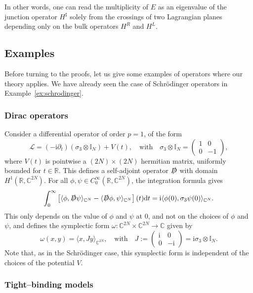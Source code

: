 \documentclass[11pt]{amsart}
\numberwithin{equation}{section} %
\newcommand\1{{\mathds 1}}
\def\C{{\mathbb C}}
\def\bbI{{\mathbb I}}
\def\R{{\mathbb R}}
\def\rd{{\mathrm{d}}}
\def\ri{{\mathrm{i}}}
\def\cL{{\mathcal L}}
\def\bra{\langle}
\def\ket{\rangle}
\def\Dirac{\slashed{D}} %
\begin{document}
In other words, one can read the multiplicity of $E$ as an eigenvalue of the junction operator $H^\sharp$ solely from the crossings of two Lagrangian planes depending only on the bulk operators $H^R$ and $H^L$.




\subsection{Examples}
\label{sec:examples}

Before turning to the proofs, let us give some examples of operators where our theory applies. We have already seen the case of Schrödinger operators in Example~\ref{ex:schrodinger}.


\subsubsection{Dirac operators}

Consider a differential operator of order $p = 1$, of the form
\[
\cL  = ( - \ri \partial_t) (\sigma_3 \otimes \bbI_{N}) + V(t), \quad \text{with} \quad
\sigma_3 \otimes \bbI_{N} = \begin{pmatrix}
    1 & 0 \\
    0 & -1
\end{pmatrix},
\]
where $V(t)$ is pointwise a $(2N) \times (2N)$ hermitian matrix, uniformly bounded for $t \in \R$. This defines a self-adjoint operator $\Dirac$ with domain $H^1(\R, \C^{2N})$. For all $\phi, \psi \in C^\infty_0(\R, \C^{2N})$, the integration formula gives
\[
    \int_0^\infty \left[ \bra \phi, \Dirac \psi \ket_{\C^N} - \bra \Dirac \phi, \psi \ket_{\C^N} \right](t) \rd t  = \ri \bra \phi(0), \sigma_3 \psi(0) \ket_{\C^N}.
\]
This only depends on the value of $\phi$ and $\psi$ at $0$, and not on the choices of $\phi$ and $\psi$, and defines the symplectic form $\omega : \C^{2N} \times \C^{2N} \to \C$ given by
\[
\omega(x, y) = \bra x, J y \ket_{\C^{2N}}, \quad \text{with} \quad 
J := \begin{pmatrix}
    \ri & 0 \\ 0 & - \ri
\end{pmatrix} = \ri \sigma_3 \otimes \bbI_N.
\]
Note that, as in the Schrödinger case, this symplectic form is independent of the choices of the potential $V$. 

\subsubsection{Tight--binding models}
\end{document}
